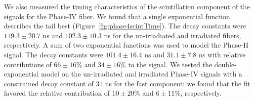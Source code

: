 \documentclass[a4paper,11pt]{article}
\begin{document}
We also measured the timing characteristics of the scintillation component of the signals for the Phase-IV fiber. We found that a single exponential function describes the tail best (Figure~\ref{fig:phase4scintTime}). The decay constants were $119.3 \pm 20.7$ ns and $102.3 \pm 10.3$ ns for the un-irradiated and irradiated fibers, respectively. A sum of two exponential functions was used to model the Phase-II signal. The decay constants were $101.4 \pm 16.4$ ns and $31.1  \pm 7.8$ ns with relative contributions of $66 \pm 16 \%$ and $34 \pm 16 \%$ to the signal. We tested the double-exponential model on the un-irradiated and irradiated Phase-IV signals with a constrained decay constant of $31$ ns for the fast component: we found that the fit favored the relative contribution of $10 \pm 20\%$ and $6 \pm 11\%$, respectively.
\end{document}
